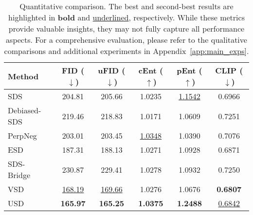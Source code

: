 \begin{table}[t!]
    \caption{Quantitative comparison. The best and second-best results are highlighted in \textbf{bold} and \underline{underlined}, respectively. While these metrics provide valuable insights, they may not fully capture all performance aspects. For a comprehensive evaluation, please refer to the qualitative comparisons and additional experiments in Appendix~\ref{app:main_exps}.}
    \vspace{-1mm}
    \label{table:comparison_main}
    \begin{center}
        \begin{tabular}{lccccc}
            \hline
            \textbf{Method} & \textbf{FID} ($\downarrow$) & \textbf{uFID} ($\downarrow$) & \textbf{cEnt} ($\uparrow$) & \textbf{pEnt} ($\uparrow$) & \textbf{CLIP} ($\downarrow$)\\ \hline
            SDS~\citep{poole2022dreamfusion}             & 204.81       & 205.66        & 1.0235            & \underline{1.1542}    & 0.6966            \\
            Debiased-SDS~\citep{hong2023debiasing}    & 219.46       & 218.83        & 1.0171            & 1.0609   & 0.7251            \\
            PerpNeg~\citep{armandpour2023re}         & 203.01       & 203.45        & \underline{1.0348}            & 1.0390    & 0.7076            \\
            ESD~\citep{wang2024taming}    & 187.31  & 188.13 & 1.0271 & 1.0928 & 0.6871\\
            SDS-Bridge~\citep{mcallister2024rethinking} & 230.87  & 229.41 & 1.0278 & 1.0932 & 0.7250 \\
            VSD~\citep{wang2024prolificdreamer}             & \underline{168.19}       & \underline{169.66}        & 1.0276            & 1.0676 & \textbf{0.6807}            \\ \hline
            USD             & \textbf{165.97}       & \textbf{165.25}        & \textbf{1.0375}            & \textbf{1.2488} & \underline{0.6842}            \\ \hline
            \end{tabular}%
    \end{center}
\end{table}
